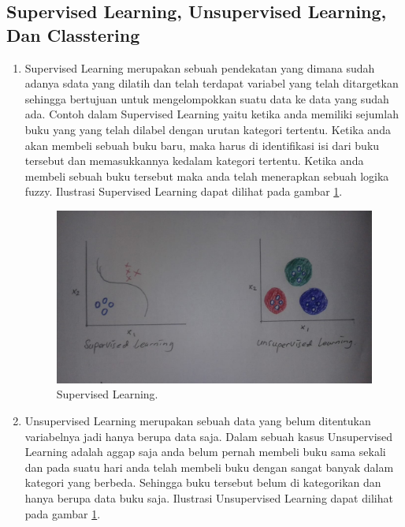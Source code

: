 \subsection{Supervised Learning, Unsupervised Learning, Dan Classtering}
\begin{enumerate}
\item Supervised Learning merupakan sebuah pendekatan yang dimana sudah adanya sdata yang dilatih dan telah terdapat variabel yang telah ditargetkan sehingga bertujuan untuk mengelompokkan suatu data ke data yang sudah ada. Contoh dalam Supervised Learning yaitu ketika anda memiliki sejumlah buku yang yang telah dilabel dengan urutan kategori tertentu. Ketika anda akan membeli sebuah buku baru, maka harus di identifikasi isi dari buku tersebut dan memasukkannya kedalam kategori tertentu. Ketika anda membeli sebuah buku tersebut maka anda telah menerapkan sebuah logika fuzzy. Ilustrasi Supervised Learning dapat dilihat pada gambar \ref{2}.

		\begin{figure}[!hbtp]
		\centerline{\includegraphics[width=1\textwidth]{figures/AIP/2.JPEG}}
		\caption{Supervised Learning.}
		\label{2}
		\end{figure}

\item Unsupervised Learning merupakan sebuah data yang belum ditentukan variabelnya jadi hanya berupa data saja. Dalam sebuah kasus Unsupervised Learning adalah aggap saja anda belum pernah membeli buku sama sekali dan pada suatu hari anda telah membeli buku dengan sangat banyak dalam kategori yang berbeda. Sehingga buku tersebut belum di kategorikan dan hanya berupa data buku saja. Ilustrasi Unsupervised Learning dapat dilihat pada gambar \ref{2}.


\end{enumerate}
